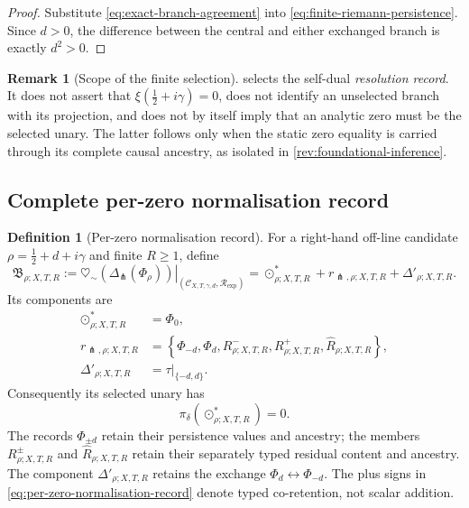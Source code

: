 \documentclass[11pt,a4paper]{article}
\theoremstyle{definition}
\newtheorem{definition}[theorem]{Definition}
\newtheorem{remark}[theorem]{Remark}
\newcommand{\Field}{\Phi}
\newcommand{\heartsim}{\heartsuit_{\sim}}
\newcommand{\Cctx}{\mathcal{C}}
\newcommand{\Rres}{\mathcal{R}}
\newcommand{\DeltaFork}{\Delta_{\pitchfork}}
\begin{document}
\begin{proof}
Substitute \cref{eq:exact-branch-agreement} into
\cref{eq:finite-riemann-persistence}. Since $d>0$, the difference between the
central and either exchanged branch is exactly $d^2>0$.
\end{proof}

\begin{remark}[Scope of the finite selection]
\label{rem:finite-selection-scope}
 selects the self-dual
\emph{resolution record}. It does not assert that
$\xi(\tfrac12+i\gamma)=0$, does not identify an unselected branch with its
projection, and does not by itself imply that an analytic zero must be the
selected unary. The latter follows only when the static zero equality is
carried through its complete causal ancestry, as isolated in
\cref{rev:foundational-inference}.
\end{remark}

\subsection{Complete per-zero normalisation record}

\begin{definition}[Per-zero normalisation record]
\label{def:per-zero-normalisation-record}
For a right-hand off-line candidate
$\rho=\tfrac12+d+i\gamma$ and finite $R\geq1$, define
\begin{equation}
\label{eq:per-zero-normalisation-record}
  \mathfrak B_{\rho;X,T,R}
  :=
  \left.
  \heartsim\!\left(\DeltaFork(\Field_\rho)\right)
  \right|_{(\Cctx_{X,T,\gamma,d},\Rres_{\mathrm{exp}})}
  =
  \odot_{\rho;X,T,R}^\ast
  +
  r_{\pitchfork,\rho;X,T,R}
  +\Delta'_{\rho;X,T,R}.
\end{equation}
Its components are
\[
 \begin{aligned}
  \odot_{\rho;X,T,R}^\ast&=\Phi_0,\\
  r_{\pitchfork,\rho;X,T,R}
  &=
  \left\{
    \Phi_{-d},\Phi_d,
    R_{\rho;X,T,R}^{-},R_{\rho;X,T,R}^{+},
    \widehat R_{\rho;X,T,R}
  \right\},\\
  \Delta'_{\rho;X,T,R}&=\tau|_{\{-d,d\}}.
 \end{aligned}
\]
Consequently its selected unary has
\[
  \pi_\delta(\odot_{\rho;X,T,R}^\ast)=0.
\]
The records $\Phi_{\pm d}$ retain their persistence values and ancestry; the
members $R_{\rho;X,T,R}^{\pm}$ and $\widehat R_{\rho;X,T,R}$ retain their
separately typed residual content and ancestry. The component
$\Delta'_{\rho;X,T,R}$ retains the exchange
$\Phi_d\leftrightarrow\Phi_{-d}$. The plus signs in
\cref{eq:per-zero-normalisation-record} denote typed co-retention, not scalar
addition.
\end{definition}
\end{document}
